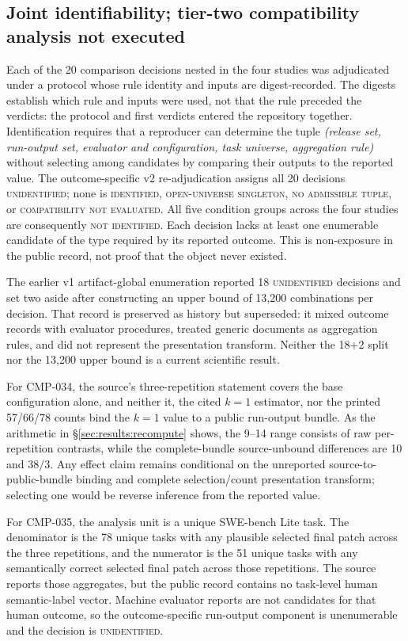 \subsection{Joint identifiability; tier-two compatibility analysis not executed}
\label{sec:results:compatibility}

Each of the 20 comparison decisions nested in the four studies was adjudicated under a
protocol whose rule identity and inputs are digest-recorded. The digests establish which rule
and inputs were used, not that the rule preceded the verdicts: the protocol and first verdicts
entered the repository together. Identification requires that a reproducer can determine the
tuple \emph{(release set, run-output set, evaluator and
configuration, task universe, aggregation rule)} without selecting among candidates by
comparing their outputs to the reported value. The outcome-specific v2 re-adjudication assigns
all 20 decisions \textsc{unidentified}; none is \textsc{identified}, \textsc{open-universe
singleton}, \textsc{no admissible tuple}, or \textsc{compatibility not evaluated}. All five
condition groups across the four studies are consequently \textsc{not identified}. Each
decision lacks at least one enumerable candidate of the type required by its reported outcome.
This is non-exposure in the public record, not proof that the object never existed.

The earlier v1 artifact-global enumeration reported 18 \textsc{unidentified} decisions and
set two aside after constructing an upper bound of 13{,}200 combinations per decision. That
record is preserved as history but superseded: it mixed outcome records with evaluator
procedures, treated generic documents as aggregation rules, and did not represent the
presentation transform. Neither the 18+2 split nor the 13{,}200 upper bound is a current
scientific result.

For CMP-034, the source's three-repetition statement covers the base configuration alone,
and neither it, the cited $k=1$ estimator, nor the printed 57/66/78 counts bind the $k=1$
value to a public run-output bundle. As the arithmetic
in \S\ref{sec:results:recompute} shows, the 9--14 range consists of raw per-repetition
contrasts, while the complete-bundle source-unbound differences are 10 and $38/3$. Any effect
claim remains conditional on the unreported source-to-public-bundle binding and complete
selection/count presentation transform; selecting one would be reverse inference from the
reported value.

For CMP-035, the analysis unit is a unique SWE-bench Lite task. The denominator is the 78
unique tasks with any plausible selected final patch across the three repetitions, and the
numerator is the 51 unique tasks with any semantically correct selected final patch across
those repetitions. The source reports those aggregates,
but the public record contains no task-level human semantic-label vector. Machine evaluator
reports are not candidates for that human outcome, so the outcome-specific run-output
component is unenumerable and the decision is \textsc{unidentified}.

